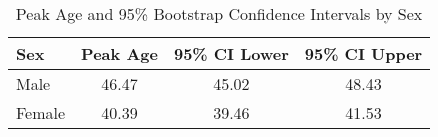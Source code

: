 
\begin{table}[ht]
\centering
\begin{tabular}{lccc}
\hline
Sex & Peak Age & 95\% CI Lower & 95\% CI Upper \\
\hline
Male &  46.47  &  45.02  &  48.43  \\
Female &  40.39  &  39.46  &  41.53  \\
\hline
\end{tabular}
\caption{Peak Age and 95\% Bootstrap Confidence Intervals by Sex}
\label{tab:peak_age}
\end{table}
